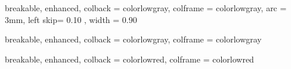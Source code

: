 {
  breakable,
  enhanced,
  colback  = colorlowgray,
  colframe = colorlowgray,
  arc      = 3mm,
  left skip= 0.10 \linewidth,
  width    = 0.90 \linewidth
}

{
  breakable,
  enhanced,
  colback  = colorlowgray,
  colframe = colorlowgray
}


{
  breakable,
  enhanced,
  colback  = colorlowred,
  colframe = colorlowred
}





